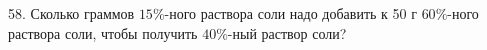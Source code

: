 58. Сколько граммов $15\%$-ного раствора соли надо добавить к 50 г $60\%$-ного раствора соли, чтобы получить $40\%$-ный раствор соли?\\
